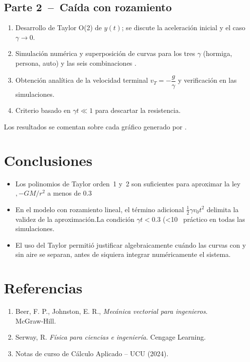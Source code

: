 \documentclass{article}
\begin{document}
\subsection*{Parte 2 – Caída con rozamiento}
\begin{enumerate}
\item Desarrollo de Taylor O(2) de $y(t)$; se discute la aceleración
inicial y el caso $\gamma\to0$.
\item Simulación numérica y superposición de curvas para los tres $\gamma$
(hormiga, persona, auto) y las seis combinaciones .
\item Obtención analítica de la velocidad terminal
$v_T=-\dfrac{g}{\gamma}$ y verificación en las simulaciones.
\item Criterio basado en $\gamma t\ll1$ para descartar la resistencia.
\end{enumerate}
Los resultados se comentan sobre cada gráfico generado por
.

\section{Conclusiones}\label{sec:conclusiones}
\begin{itemize}
\item Los polinomios de Taylor orden 1 y 2 son suficientes para aproximar
la ley $,-GM/r^2$ a menos de 0.3 %
\item En el modelo con rozamiento lineal, el término adicional
$\tfrac12\gamma v_0 t^2$ delimita la validez de la aproximación.La condición $\gamma t<0.3$ (<10 %
práctico en todas las simulaciones.
\item El uso del Taylor permitió justificar algebraicamente cuándo las
curvas con y sin aire se separan, antes de siquiera integrar
numéricamente el sistema.
\end{itemize}

\section{Referencias}
\begin{enumerate}
\item Beer, F. P., Johnston, E. R., \emph{Mecánica vectorial para ingenieros}. McGraw‑Hill.
\item Serway, R.
\emph{Física para ciencias e ingeniería}. Cengage Learning.
\item Notas de curso de Cálculo Aplicado – UCU (2024).
\end{enumerate}
\end{document}
